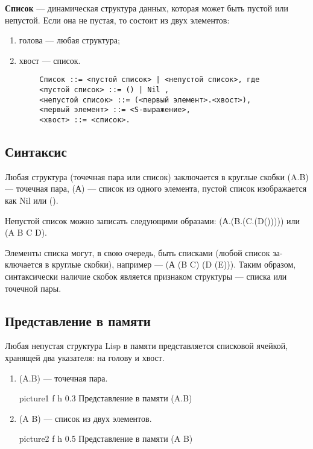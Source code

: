 \textbf{Список} --- динамическая структура данных, которая может быть пустой или непустой. Если она не пустая, то состоит из двух элементов:

\begin{enumerate}[label={\arabic*)}]
	\item голова --- любая структура;
	\item хвост --- список.
\end{enumerate}

\begin{center}
	\captionsetup{justification=raggedright,singlelinecheck=off}
	\begin{lstlisting}
		Список ::= <пустой список> | <непустой список>, где 
		<пустой список> ::= () | Nil ,
		<непустой список> ::= (<первый элемент>.<хвост>), 
		<первый элемент> ::= <S-выражение>,
		<хвост> ::= <список>.
	\end{lstlisting}
\end{center}	

\subsection{Синтаксис}

Любая структура (точечная пара или список) заключается в круглые
скобки (A.B) --- точечная пара, (А) --- список из одного элемента, пустой список изображается как Nil или ().

Непустой список можно записать следующими образами: (А.(B.(C.(D())))) или (A B C D).

Элементы списка могут, в свою очередь, быть списками (любой список за- ключается в круглые скобки), например — (А (B C) (D (E))). Таким образом, синтаксически наличие скобок является признаком структуры — списка или точечной пары.

\subsection{Представление в памяти}

Любая непустая структура Lisp в памяти представляется списковой ячейкой, хранящей два указателя: на голову и хвост.

\clearpage

\begin{enumerate}[label={\arabic*)}]
	\item (A.B) --- точечная пара.
	
	{picture1} %
	{f} %
	{h} %
	{0.3\textwidth} %
	{Представление в памяти (A.B)} %
	 
	\item (A B) — список из двух элементов.
	
	{picture2} %
	{f} %
	{h} %
	{0.5\textwidth} %
	{Представление в памяти (A B)} %
	
\end{enumerate}


